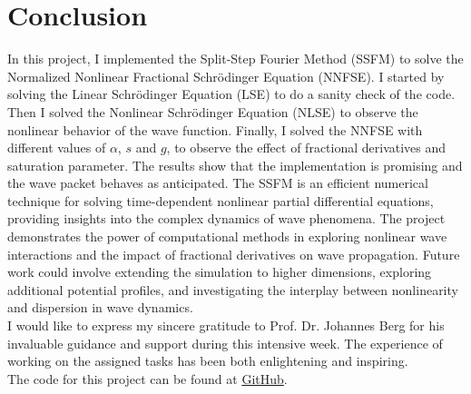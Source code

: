 \documentclass[8pt, a4paper, twocolumn]{article}
\begin{document}
\section{Conclusion}

In this project, I implemented the Split-Step Fourier Method (SSFM) to solve the Normalized Nonlinear Fractional
Schrödinger Equation (NNFSE). I started by solving the Linear Schrödinger Equation (LSE) to do a sanity check of the code.
Then I solved the Nonlinear Schrödinger Equation (NLSE) to observe the nonlinear behavior of the wave function. Finally, I solved
the NNFSE with different values of $\alpha$, $s$ and $g$, to observe the effect of fractional derivatives and saturation parameter.
The results show that the implementation is promising and the wave packet behaves as anticipated. The SSFM is an efficient
numerical technique for solving time-dependent nonlinear partial differential equations, providing insights into the
complex dynamics of wave phenomena. The project demonstrates the power of computational methods in exploring
nonlinear wave interactions and the impact of fractional derivatives on wave propagation. Future work could involve
extending the simulation to higher dimensions, exploring additional potential profiles, and investigating the
interplay between nonlinearity and dispersion in wave dynamics.\\

I would like to express my sincere gratitude to Prof. Dr. Johannes Berg for his invaluable guidance and 
support during this intensive week. The experience of working on the assigned tasks has been both 
enlightening and inspiring.\\

The code for this project can be found at \href{https://github.com/sahilugale/julia-intensive-week.git}{GitHub}.



\end{document}
